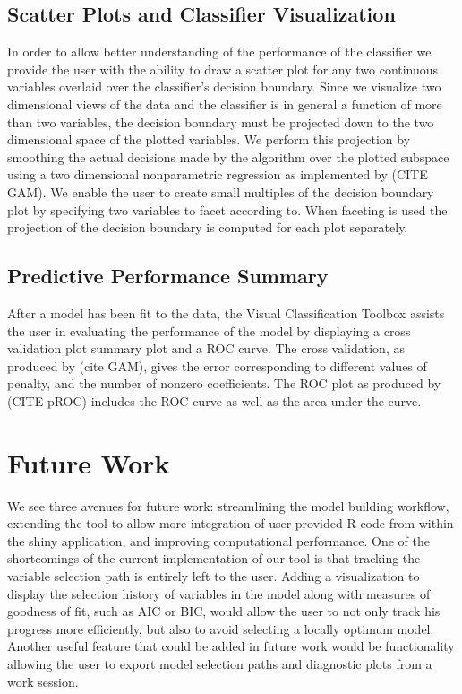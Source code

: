 \documentclass[tog]{acmsiggraph}
\begin{document}
\subsection{Scatter Plots and Classifier Visualization}
In order to allow better understanding of the performance of the classifier we provide the user with the ability to draw a scatter plot for any two continuous variables overlaid over the classifier’s decision boundary. Since we visualize two dimensional views of the data and the classifier is in general a function of more than two variables, the decision boundary must be projected down to the two dimensional space of the plotted variables. We perform this projection by smoothing the actual decisions made by the algorithm over the plotted subspace using a two dimensional nonparametric regression as implemented by (CITE GAM).  We enable the user to create small multiples of the decision boundary plot by specifying two variables to facet according to. When faceting is used the projection of the decision boundary is computed for each plot separately.

\subsection{Predictive Performance Summary}
After a model has been fit to the data, the Visual Classification Toolbox assists the user in evaluating the performance of the model by displaying a cross validation plot summary plot and a ROC curve. The cross validation, as produced by (cite GAM), gives the error corresponding to different values of penalty, and the number of nonzero coefficients. The ROC plot as produced by (CITE pROC)  includes the ROC curve as well as the area under the curve. 

\section{Future Work}
We see three avenues for future work: streamlining the model building workflow, extending the tool to allow more integration of user provided R code from within the shiny application, and improving computational performance. One of the shortcomings of the current implementation of our tool is that tracking the variable selection path is entirely left to the user. Adding a visualization to display the selection history of variables in the model along with measures of goodness of fit, such as AIC or BIC, would allow the user to not only track his progress more efficiently, but also to avoid selecting a locally optimum model. Another useful feature that could be added in future work would be functionality allowing the user to export model selection paths and diagnostic plots from a work session. 
\end{document}
